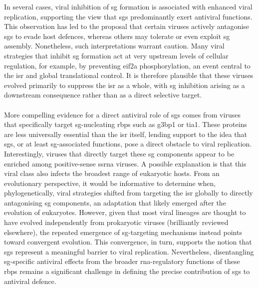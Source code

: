 In several cases, viral inhibition of \gls{sg} formation is associated with enhanced viral replication\cite{nakagawa_inhibition_2018, nabeel-shah_sars-cov-2_2022, bonenfant_zika_2019}, supporting the view that \glspl{sg} predominantly exert antiviral functions. This observation has led to the proposal that certain viruses actively antagonise \glspl{sg} to evade host defences\cite{nakagawa_inhibition_2018,guan_multiple_2023}, whereas others may tolerate or even exploit \gls{sg} assembly\cite{lindquist_activation_2011, sun_newcastle_2017, guan_multiple_2023}. Nonetheless, such interpretations warrant caution. Many viral strategies that inhibit \gls{sg} formation act at very upstream levels of cellular regulation, for example, by preventing \gls{eif2a} phosphorylation\cite{xu_pseudorabies_2020}, an event central to the \gls{isr} and global translational control\cite{donnelly_eif2_2013, aulas_stress-specific_2017, wek_role_2018}. It is therefore plausible that these viruses evolved primarily to suppress the \gls{isr} as a whole, with \gls{sg} inhibition arising as a downstream consequence rather than as a direct selective target.
\\
\\
More compelling evidence for a direct antiviral role of \glspl{sg} comes from viruses that specifically target \gls{sg}-nucleating \glspl{rbp} such as \gls{g3bp1} or \gls{tia1}\cite{nabeel-shah_sars-cov-2_2022, bonenfant_zika_2019, emara_interaction_2007}. These proteins are less universally essential than the \gls{isr} itself, lending support to the idea that \glspl{sg}, or at least \gls{sg}-associated functions, pose a direct obstacle to viral replication. Interestingly, viruses that directly target these \gls{sg} components appear to be enriched among positive-sense \gls{ssrna} viruses\cite{guan_multiple_2023}. A possible explanation is that this viral class also infects the broadest range of eukaryotic hosts\cite{koonin_origins_2015}. From an evolutionary perspective, it would be informative to determine when, phylogenetically, viral strategies shifted from targeting the \gls{isr} globally to directly antagonising \gls{sg} components, an adaptation that likely emerged after the evolution of eukaryotes. However, given that most viral lineages are thought to have evolved independently from prokaryotic viruses (brilliantly reviewed elsewhere\cite{koonin_origins_2015}), the repeated emergence of \gls{sg}-targeting mechanisms instead points toward convergent evolution. This convergence, in turn, supports the notion that \glspl{sg} represent a meaningful barrier to viral replication. Nevertheless, disentangling \gls{sg}-specific antiviral effects from the broader \gls{rna}-regulatory functions of these \glspl{rbp} remains a significant challenge in defining the precise contribution of \glspl{sg} to antiviral defence\cite{glauninger_stressful_2022}.
